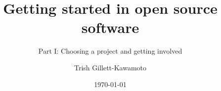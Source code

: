 \documentclass{beamer}
\title{Getting started in open source software}
\subtitle{Part I: Choosing a project and getting involved}
\author{Trish Gillett-Kawamoto}
\date{\today}
\institute{Pyladies Montreal}
\begin{document}
\begin{frame}[plain,t]
\titlepage
\end{frame}




\begin{frame}{}
	
\end{frame}

\begin{frame}{}
	
\end{frame}

\begin{frame}{}
	
\end{frame}

\begin{frame}{}
	
\end{frame}

\begin{frame}{}
	
\end{frame}





\ThankYouFrame
\end{document}
